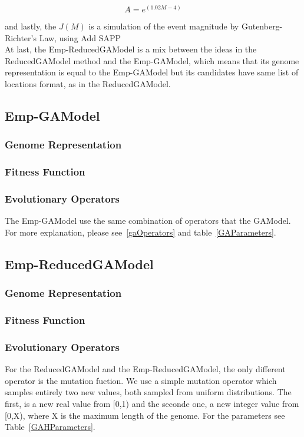\begin{equation}
A = e^{(1.02M -4)}
\end{equation}


and lastly, the $J(M)$ is a simulation of the event magnitude by
Gutenberg-Richter's Law, using Add SAPP\\
%

At last, the Emp-ReducedGAModel is a mix between the ideas in the
ReducedGAModel method and the Emp-GAModel, which means that its genome
representation is equal to the Emp-GAModel but its candidates have
same list of locations format, as in the ReducedGAModel.\\
\subsection{Emp-GAModel}
\subsubsection{Genome Representation}
\subsubsection{Fitness Function}
\subsubsection{Evolutionary Operators}
The Emp-GAModel use the same combination of operators that the GAModel. For more explanation, please see~\ref{gaOperators} and table~\ref{GAParameters}.\\

\subsection{Emp-ReducedGAModel}
\subsubsection{Genome Representation}
\subsubsection{Fitness Function}
\subsubsection{Evolutionary Operators}
For the ReducedGAModel and the Emp-ReducedGAModel, the only different
operator is the mutation fuction. We use a simple mutation operator
which samples entirely two new values, both sampled from uniform
distributions. The first, is a new real value from [0,1) and the
seconde one, a new integer value from [0,X), where X is the maximum
length of the genome. For the parameters see
Table~\ref{GAHParameters}.

